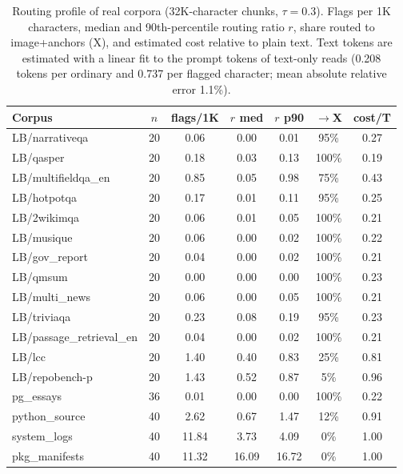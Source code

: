 \begin{table}[!htbp]
\centering\footnotesize\setlength{\tabcolsep}{2.2pt}
\caption{Routing profile of real corpora (32K-character chunks, $\tau{=}0.3$). Flags per 1K characters, median and 90th-percentile routing ratio $r$, share routed to image+anchors (X), and estimated cost relative to plain text. Text tokens are estimated with a linear fit to the prompt tokens of text-only reads (0.208 tokens per ordinary and 0.737 per flagged character; mean absolute relative error 1.1\%).}
\label{tab:app_corpora}
\begin{tabular}{l c c c c c c}
\toprule
Corpus & $n$ & flags/1K & $r$ med & $r$ p90 & $\to$X & cost/T \\
\midrule
LB/narrativeqa & 20 & 0.06 & 0.00 & 0.01 & 95\% & 0.27 \\
LB/qasper & 20 & 0.18 & 0.03 & 0.13 & 100\% & 0.19 \\
LB/multifieldqa\_en & 20 & 0.85 & 0.05 & 0.98 & 75\% & 0.43 \\
LB/hotpotqa & 20 & 0.17 & 0.01 & 0.11 & 95\% & 0.25 \\
LB/2wikimqa & 20 & 0.06 & 0.01 & 0.05 & 100\% & 0.21 \\
LB/musique & 20 & 0.06 & 0.00 & 0.02 & 100\% & 0.22 \\
LB/gov\_report & 20 & 0.04 & 0.00 & 0.02 & 100\% & 0.21 \\
LB/qmsum & 20 & 0.00 & 0.00 & 0.00 & 100\% & 0.23 \\
LB/multi\_news & 20 & 0.06 & 0.00 & 0.05 & 100\% & 0.21 \\
LB/triviaqa & 20 & 0.23 & 0.08 & 0.19 & 95\% & 0.23 \\
LB/passage\_retrieval\_en & 20 & 0.04 & 0.00 & 0.02 & 100\% & 0.21 \\
LB/lcc & 20 & 1.40 & 0.40 & 0.83 & 25\% & 0.81 \\
LB/repobench-p & 20 & 1.43 & 0.52 & 0.87 & 5\% & 0.96 \\
pg\_essays & 36 & 0.01 & 0.00 & 0.00 & 100\% & 0.22 \\
python\_source & 40 & 2.62 & 0.67 & 1.47 & 12\% & 0.91 \\
system\_logs & 40 & 11.84 & 3.73 & 4.09 & 0\% & 1.00 \\
pkg\_manifests & 40 & 11.32 & 16.09 & 16.72 & 0\% & 1.00 \\
\bottomrule
\end{tabular}
\end{table}
